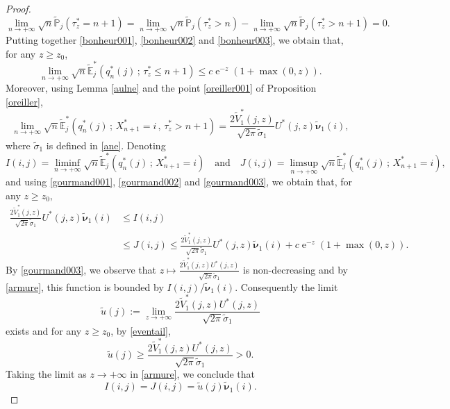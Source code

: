 \documentclass[12pt]{amsart}
\theoremstyle{definition}
\numberwithin{equation}{section}
\def\tt#1{\tilde{#1}}
\def\tbs#1{\tilde{\boldsymbol{#1}}}
\def\tbb#1{\tilde{\mathbb{#1}}}
\def\geq{\geqslant}
\def\leq{\leqslant}
\DeclareMathOperator{\e}{e}
\begin{document}
\begin{proof}
\begin{equation}
\label{bonheur003}
\lim_{n\to+\infty} \sqrt{n}\tbb P_j \left( \tau_z^* = n+1 \right) = \lim_{n\to+\infty} \sqrt{n}\tbb P_j \left( \tau_z^* > n \right) - \lim_{n\to+\infty} \sqrt{n}\tbb P_j \left( \tau_z^* > n+1 \right) = 0.
\end{equation}
Putting together \eqref{bonheur001}, \eqref{bonheur002} and \eqref{bonheur003}, we obtain that, for any $z\geq z_0$,
\begin{equation}
\label{gourmand002}
\lim_{n\to+\infty} \sqrt{n} \tbb E_j^* \left( q_n^*(j) \,;\, \tau_z^* \leq n+1 \right) \leq c \e^{-z} \left( 1+\max(0,z) \right).
\end{equation}
Moreover, using Lemma \ref{aulne} and the point \ref{oreiller001} of Proposition \ref{oreiller},
\begin{equation}
\label{gourmand003}
\lim_{n\to+\infty} \sqrt{n} \tbb E_j^* \left( q_n^*(j) \,;\, X_{n+1}^* = i \,,\, \tau_z^* > n+1 \right) = \frac{2\tt V_1^*(j,z)}{\sqrt{2\pi} \tt \sigma_1} U^*(j,z) \tbs \nu_1(i),
\end{equation}
where $\tt \sigma_1$ is defined in \eqref{ane}.
Denoting
\[
I(i,j) = \liminf_{n\to +\infty} \sqrt{n}\tbb E_j^* \left( q_n^*(j) \,;\, X_{n+1}^* = i \right) \quad \text{and} \quad J(i,j) = \limsup_{n\to +\infty} \sqrt{n} \tbb E_j^* \left( q_n^*(j) \,;\, X_{n+1}^* = i \right),
\]
and using \eqref{gourmand001}, \eqref{gourmand002} and \eqref{gourmand003}, we obtain that, for any $z \geq z_0,$
\begin{align}
\label{armure}
\frac{2\tt V_1^*(j,z)}{\sqrt{2\pi} \tt \sigma_1} U^*(j,z) \tbs \nu_1(i) &\leq I(i,j) \\
&\leq J(i,j) \leq \frac{2\tt V_1^*(j,z)}{\sqrt{2\pi} \tt \sigma_1} U^*(j,z)  \tbs \nu_1(i) + c \e^{-z} \left( 1+\max(0,z) \right). \nonumber
\end{align}
By \eqref{gourmand003}, we observe that $z \mapsto \frac{2\tt V_1^*(j,z)U^*(j,z)}{\sqrt{2\pi} \tt \sigma_1}$ is non-decreasing and by \eqref{armure}, this function is bounded by $I(i,j)/ \tbs \nu_1(i)$. Consequently the limit
\[
\tt u(j) := \lim_{z\to+\infty} \frac{2\tt V_1^*(j,z)U^*(j,z)}{\sqrt{2\pi} \tt \sigma_1} 
\]
exists and for any $z \geq z_0$, by \eqref{eventail},
\begin{equation}
\label{luxe}
\tt u(j) \geq \frac{2\tt V_1^*(j,z)U^*(j,z)}{\sqrt{2\pi} \tt \sigma_1} >0.
\end{equation}
Taking the limit as $z \to +\infty$ in \eqref{armure}, we conclude that
\[
I(i,j) = J(i,j) = \tt u(j) \tbs \nu_1(i).
\]
\end{proof}
\end{document}
